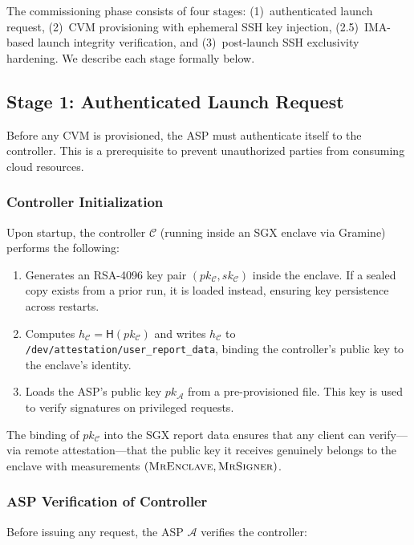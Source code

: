 The commissioning phase consists of four stages: (1)~authenticated launch request, (2)~CVM provisioning with ephemeral SSH key injection, (2.5)~IMA-based launch integrity verification, and (3)~post-launch SSH exclusivity hardening. We describe each stage formally below.

\subsection{Stage 1: Authenticated Launch Request}
\label{sec:commissioning:stage1}

Before any CVM is provisioned, the ASP must authenticate itself to the controller. This is a prerequisite to prevent unauthorized parties from consuming cloud resources.

\subsubsection{Controller Initialization}
Upon startup, the controller $\mathcal{C}$ (running inside an SGX enclave via Gramine) performs the following:

\begin{enumerate}
    \item Generates an RSA-4096 key pair $(pk_\mathcal{C}, sk_\mathcal{C})$ inside the enclave. If a sealed copy exists from a prior run, it is loaded instead, ensuring key persistence across restarts.
    \item Computes $h_\mathcal{C} = \textsf{H}(pk_\mathcal{C})$ and writes $h_\mathcal{C}$ to \texttt{/dev/attestation/user\_report\_data}, binding the controller's public key to the enclave's identity.
    \item Loads the ASP's public key $pk_\mathcal{A}$ from a pre-provisioned file. This key is used to verify signatures on privileged requests.
\end{enumerate}

\noindent The binding of $pk_\mathcal{C}$ into the SGX report data ensures that any client can verify---via remote attestation---that the public key it receives genuinely belongs to the enclave with measurements $(\textsc{MrEnclave}, \textsc{MrSigner})$.

\subsubsection{ASP Verification of Controller}
Before issuing any request, the ASP $\mathcal{A}$ verifies the controller:

